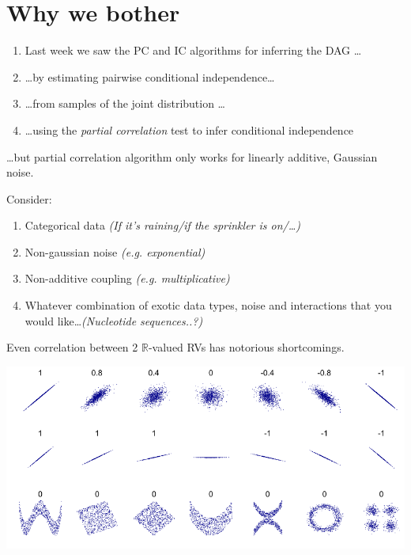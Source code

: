 \clearpage

\section{Why we bother}

\begin{enumerate}
	\item Last week we saw the PC and IC algorithms for inferring the DAG \ldots 
	\item \ldots by estimating pairwise conditional independence\ldots
	\item \ldots from samples of the joint distribution \ldots
	\item \ldots using the \emph{partial correlation} test to infer conditional independence
\end{enumerate}
\clearpage
\dots but partial correlation algorithm only works for linearly additive, Gaussian noise.
\clearpage

Consider:
\begin{enumerate}
\item Categorical data \emph{(If it's raining/if the sprinkler is on/\ldots)}
\item Non-gaussian noise \emph{(e.g. exponential)}
\item Non-additive coupling \emph{(e.g. multiplicative)}
\item Whatever combination of exotic data types, noise and interactions that you would like\dots \emph{(Nucleotide sequences..?)}
\end{enumerate}
\clearpage
Even correlation between 2 $\mathbb{R}$-valued RVs has notorious shortcomings.

\includegraphics[width=\textwidth]{Correlation_examples2.pdf}
\clearpage
